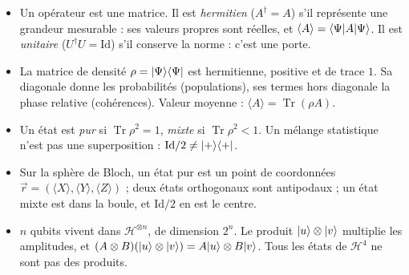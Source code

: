 \begin{aretenir}
\begin{itemize}
  \item Un opérateur est une matrice. Il est \emph{hermitien} ($A^\dagger=A$) s'il représente une
        grandeur mesurable : ses valeurs propres sont réelles, et $\langle A\rangle=\langle \Psi|A|\Psi\rangle$.
        Il est \emph{unitaire} ($U^\dagger U=\mathrm{Id}$) s'il conserve la norme : c'est une porte.
  \item La matrice de densité $\rho=|\Psi\rangle\langle \Psi|$ est hermitienne, positive et de trace $1$.
        Sa diagonale donne les probabilités (populations), ses termes hors diagonale la phase relative
        (cohérences). Valeur moyenne : $\langle A\rangle=\operatorname{Tr}(\rho A)$.
  \item Un état est \emph{pur} si $\operatorname{Tr}\rho^2=1$, \emph{mixte} si $\operatorname{Tr}\rho^2<1$.
        Un mélange statistique n'est pas une superposition : $\mathrm{Id}/2\neq|+\rangle\langle +|$.
  \item Sur la sphère de Bloch, un état pur est un point de coordonnées
        $\vec r=(\langle X\rangle,\langle Y\rangle,\langle Z\rangle)$ ; deux états orthogonaux sont
        antipodaux ; un état mixte est dans la boule, et $\mathrm{Id}/2$ en est le centre.
  \item $n$ qubits vivent dans $\mathcal{H}^{\otimes n}$, de dimension $2^n$. Le produit
        $|u\rangle\otimes|v\rangle$ multiplie les amplitudes, et
        $(A\otimes B)(|u\rangle\otimes|v\rangle)=A|u\rangle\otimes B|v\rangle$. Tous les états de
        $\mathcal{H}^4$ ne sont pas des produits.
\end{itemize}
\end{aretenir}

